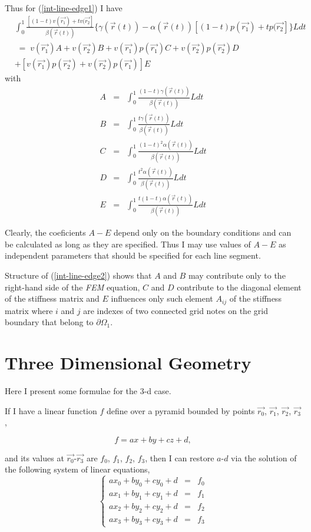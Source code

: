 \documentclass{article}
\def\eqn#1{\begin{displaymath}#1\end{displaymath}}
\def\eqnl#1#2{\begin{equation}\label{#1}#2\end{equation}}
\def\eqnm#1{\begin{eqnarray*}#1\end{eqnarray*}}
\def\eqnml#1#2{\begin{eqnarray}\label{#1}#2\end{eqnarray}}
\def\arr#1#2{\begin{array}{#1}#2\end{array}}
\def\rf#1{(\ref{#1})}
\def\EQS{\; = \;}
\theoremstyle{marginbreak} \theorembodyfont{\itshape}
\begin{document}
Thus for \rf{int-line-edge1} I have
\eqnml{int-line-edge2}{
&
\displaystyle \nonumber
\int_0^1
    \frac{[(1 - t)v(\vec{r_1}) + t v(\vec{r_2}]}{\beta(\vec{r}(t))}
  \lbrace\gamma(\vec{r}(t)) -  \alpha(\vec{r}(t))
  [(1 - t)p(\vec{r_1}) + t p(\vec{r_2}]\rbrace L dt
\\
& \displaystyle
\EQS
v(\vec{r_1}) A + v(\vec{r_2}) B
  + v(\vec{r_1}) p(\vec{r_1}) C + v(\vec{r_2}) p(\vec{r_2}) D
\\ \nonumber
& \displaystyle
  + [v(\vec{r_1}) p(\vec{r_2}) + v(\vec{r_2}) p(\vec{r_1})] E
}
with
\eqnm{
A &=& \int_0^1 \frac{(1 - t)\gamma(\vec{r}(t))}{\beta(\vec{r}(t))} L dt \\
B &=& \int_0^1 \frac{t\gamma(\vec{r}(t))}{\beta(\vec{r}(t))} L dt \\
C &=& \int_0^1 \frac{(1 - t)^2 \alpha(\vec{r}(t))}{\beta(\vec{r}(t))} L dt \\
D &=& \int_0^1 \frac{t^2 \alpha(\vec{r}(t))}{\beta(\vec{r}(t))} L dt \\
E &=& \int_0^1 \frac{t(1 - t) \alpha(\vec{r}(t))}{\beta(\vec{r}(t))} L dt
}

Clearly, the coeficients $A-E$ depend only on the boundary conditions
and can be calculated as long as they are specified. Thus I may use values
of $A-E$ as independent parameters that should be specified for
each line segment.

Structure of \rf{int-line-edge2} shows that $A$ and $B$ may contribute
only to the right-hand side of the {\itshape FEM} equation,
$C$ and $D$ contribute to the diagonal element of the stiffness matrix and
$E$ influences only such element $A_{ij}$ of the stiffness matrix where
$i$ and $j$ are indexes of two connected grid notes on the grid boundary
that belong to $\partial\Omega_1$.

\section{Three Dimensional Geometry}

Here I present some formulae for the 3-d case.
\par

If I have a linear function $f$ define over a pyramid bounded by points
$\vec{r_0}$, $\vec{r_1}$, $\vec{r_2}$, $\vec{r_3}$,

\eqn{ f = ax + by + cz + d, }

and its values at $\vec{r_0}$-$\vec{r_3}$ are $f_0$, $f_1$, $f_2$, $f_3$,
then I can restore $a$-$d$ via the solution of the following system of
linear equations,
\eqnl{linear-coeficients-eqn-three-d}{
    \left\lbrace \arr{rcl}{
    ax_0 + by_0 + cy_0 + d & = & f_0 \\
    ax_1 + by_1 + cy_1 + d & = & f_1 \\
    ax_2 + by_2 + cy_2 + d & = & f_2 \\
    ax_3 + by_3 + cy_3 + d & = & f_3
    } \right.
}
\end{document}
